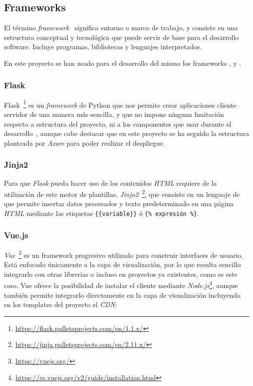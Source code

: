 \subsection{Frameworks}
El término \textit{framework}~\cite{wiki:framework} significa entorno o marco de trabajo, y consiste en una estructura conceptual y tecnológica que puede servir de base para el desarrollo software. Incluye programas, bibliotecas y lenguajes interpretados.


En este proyecto se han usado para el desarrollo del mismo los frameworks ,  y .


\subsubsection{Flask}\label{sub:flask}
Flask~\footnote{\url{https://flask.palletsprojects.com/en/1.1.x/}} es un \textit{framework} de Python que nos permite crear aplicaciones cliente--servidor de una manera más sencilla, y que no impone ninguna limitación respecto a estructura del proyecto, ni a los componentes que usar durante el desarrollo~\cite{grinberg2014flask}, aunque cabe destacar que en este proyecto se ha seguido la estructura planteada por \textit{Azure} para poder realizar el despliegue.

\subsubsection{Jinja2}\label{sub:jinja}
Para que \textit{Flask} pueda hacer uso de los contenidos \textit{HTML} requiere de la utilización de este motor de plantillas, \textit{Jinja2}~\footnote{\url{https://jinja.palletsprojects.com/en/2.11.x/}}, que consiste en un lenguaje de que permite insertar datos procesados y texto predeterminado en una página \textit{HTML} mediante las etiquetas \verb|{{variable}}| ó \verb|{% expresión %}|.


\subsubsection{Vue.js}\label{sub:vue}
\textit{Vue}~\footnote{\url{https://vuejs.org/}} es un framework progresivo utilizado para construir interfaces de usuario. Está enfocado únicamente a la capa de visualización, por lo que resulta sencillo integrarlo con otras librerías o incluso en proyectos ya existentes, como es este caso.
Vue ofrece la posibilidad de instalar el cliente mediante \textit{Node.js}\footnote{\url{https://es.vuejs.org/v2/guide/installation.html}}, aunque también permite integrarlo directamente en la capa de visualización incluyendo en los templates del proyecto el \textit{CDN}:

